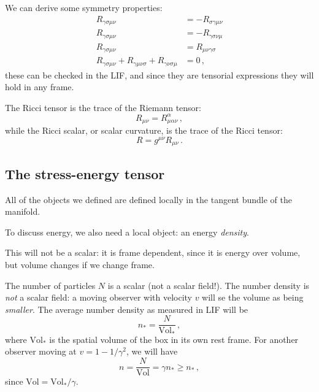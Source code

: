 \documentclass[main.tex]{subfiles}
\begin{document}
We can derive some symmetry properties: 
%
\begin{subequations}
\begin{align}
  R_{\gamma \sigma \mu \nu } &= - R_{\sigma \gamma \mu \nu }   \\
  R_{\gamma \sigma \mu \nu } &= - R_{\gamma \sigma \nu \mu }  \\
  R_{\gamma \sigma \mu \nu } &= R_{\mu \nu \gamma \sigma } \\
  R_{\gamma \sigma \mu \nu } + R_{\gamma \mu \nu \sigma } + R_{\gamma \nu \sigma \mu } &= 0
\,,
\end{align}
\end{subequations}
%
these can be checked in the LIF, and since they are tensorial expressions they will hold in any frame.

\begin{definition}
The Ricci tensor is the trace of the Riemann tensor:
    \begin{equation}
      R_{\mu \nu } = R^{\alpha }_{\mu \alpha \nu }
    \,,
    \end{equation}
while the Ricci scalar, or scalar curvature, is the trace of the Ricci tensor: 
%
\begin{equation}
  R = g^{\mu \nu }R_{\mu \nu }
\,.
\end{equation}
\end{definition}

\subsection{The stress-energy tensor}

All of the objects we defined are defined locally in the tangent bundle of the manifold.

To discuss energy, we also need a local object: an energy \emph{density}.

This will not be a scalar: it is frame dependent, since it is energy over volume, but volume changes if we change frame.

The number of particles \(N\) is a scalar (not a scalar field!).
The number density is \emph{not} a scalar field: a moving observer with velocity \(v\) will se the volume as being \emph{smaller}. The average number density as measured in LIF will be 
%
\begin{equation}
  n_{*} = \frac{N}{\text{Vol}_{*}}
\,,
\end{equation}
%
where \(\text{Vol}_{*}\) is the spatial volume of the box in its own rest frame. For another observer moving at \(v = 1 - 1/ \gamma^2\), we will have 
%
\begin{equation}
  n = \frac{N}{\text{Vol}} = \gamma n_{*} \geq n_{*}
\,,
\end{equation}
since \(\text{Vol} = \text{Vol}_{*}/ \gamma \).
\end{document}
